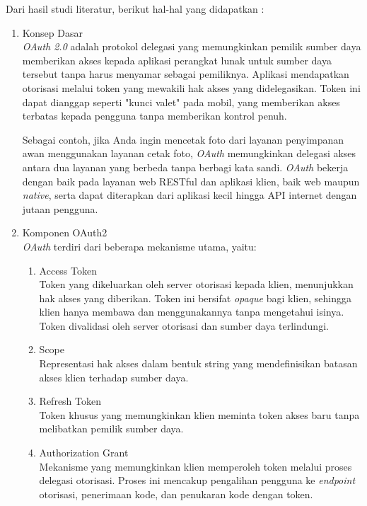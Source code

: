 Dari hasil studi literatur, berikut hal-hal yang didapatkan :
\begin{enumerate}[label*=\arabic*.,ref=\arabic*]
    \item Konsep Dasar \\
    \textit{OAuth 2.0} adalah protokol delegasi yang memungkinkan pemilik sumber daya memberikan akses kepada aplikasi perangkat lunak untuk sumber daya tersebut tanpa harus menyamar sebagai pemiliknya. Aplikasi mendapatkan otorisasi melalui token yang mewakili hak akses yang didelegasikan. Token ini dapat dianggap seperti "kunci valet" pada mobil, yang memberikan akses terbatas kepada pengguna tanpa memberikan kontrol penuh.

    Sebagai contoh, jika Anda ingin mencetak foto dari layanan penyimpanan awan menggunakan layanan cetak foto, \textit{OAuth} memungkinkan delegasi akses antara dua layanan yang berbeda tanpa berbagi kata sandi. \textit{OAuth} bekerja dengan baik pada layanan web RESTful dan aplikasi klien, baik web maupun \textit{native}, serta dapat diterapkan dari aplikasi kecil hingga API internet dengan jutaan pengguna.

    \item Komponen OAuth2 \\ 
    \textit{OAuth} terdiri dari beberapa mekanisme utama, yaitu:
        \begin{enumerate}[label=\alph*.]
            \item Access Token \\
            Token yang dikeluarkan oleh server otorisasi kepada klien, menunjukkan hak akses yang diberikan. Token ini bersifat \textit{opaque} bagi klien, sehingga klien hanya membawa dan menggunakannya tanpa mengetahui isinya. Token divalidasi oleh server otorisasi dan sumber daya terlindungi.
            \item Scope \\
            Representasi hak akses dalam bentuk string yang mendefinisikan batasan akses klien terhadap sumber daya.
            \item Refresh Token \\
            Token khusus yang memungkinkan klien meminta token akses baru tanpa melibatkan pemilik sumber daya.
            \item Authorization Grant \\
            Mekanisme yang memungkinkan klien memperoleh token melalui proses delegasi otorisasi. Proses ini mencakup pengalihan pengguna ke \textit{endpoint} otorisasi, penerimaan kode, dan penukaran kode dengan token.
        \end{enumerate}


\end{enumerate}
